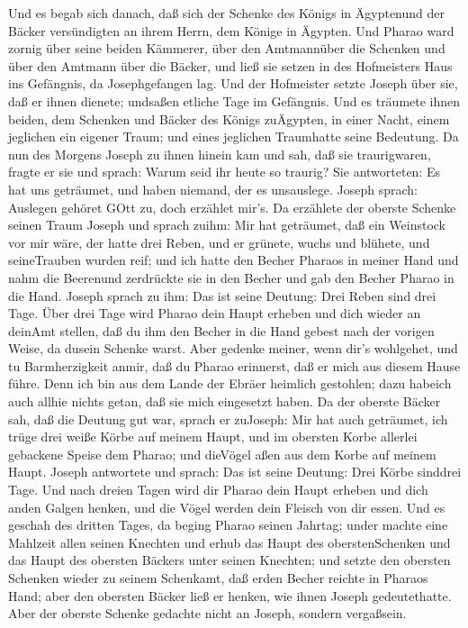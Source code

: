  Und es begab sich danach, daß sich der Schenke des Königs
in Ägyptenund der Bäcker versündigten an ihrem Herrn, dem Könige in
Ägypten.  Und Pharao ward zornig über seine beiden Kämmerer,
über den Amtmannüber die Schenken und über den Amtmann über die Bäcker,
 und ließ sie setzen in des Hofmeisters Haus ins Gefängnis,
da Josephgefangen lag.  Und der Hofmeister setzte Joseph
über sie, daß er ihnen dienete; undsaßen etliche Tage im Gefängnis.
 Und es träumete ihnen beiden, dem Schenken und Bäcker des
Königs zuÄgypten, in einer Nacht, einem jeglichen ein eigener Traum; und
eines jeglichen Traumhatte seine Bedeutung.  Da nun des
Morgens Joseph zu ihnen hinein kam und sah, daß sie traurigwaren,
 fragte er sie und sprach: Warum seid ihr heute so traurig?
 Sie antworteten: Es hat uns geträumet, und haben niemand,
der es unsauslege. Joseph sprach: Auslegen gehöret GOtt zu, doch
erzählet mir's.  Da erzählete der oberste Schenke seinen
Traum Joseph und sprach zuihm: Mir hat geträumet, daß ein Weinstock vor
mir wäre,  der hatte drei Reben, und er grünete, wuchs und
blühete, und seineTrauben wurden reif;  und ich hatte den
Becher Pharaos in meiner Hand und nahm die Beerenund zerdrückte sie in
den Becher und gab den Becher Pharao in die Hand.  Joseph
sprach zu ihm: Das ist seine Deutung: Drei Reben sind drei Tage.
 Über drei Tage wird Pharao dein Haupt erheben und dich
wieder an deinAmt stellen, daß du ihm den Becher in die Hand gebest nach
der vorigen Weise, da dusein Schenke warst.  Aber gedenke
meiner, wenn dir's wohlgehet, und tu Barmherzigkeit anmir, daß du Pharao
erinnerst, daß er mich aus diesem Hause führe.  Denn ich
bin aus dem Lande der Ebräer heimlich gestohlen; dazu habeich auch
allhie nichts getan, daß sie mich eingesetzt haben.  Da der
oberste Bäcker sah, daß die Deutung gut war, sprach er zuJoseph: Mir hat
auch geträumet, ich trüge drei weiße Körbe auf meinem Haupt,
 und im obersten Korbe allerlei gebackene Speise dem
Pharao; und dieVögel aßen aus dem Korbe auf meinem Haupt. 
Joseph antwortete und sprach: Das ist seine Deutung: Drei Körbe sinddrei
Tage.  Und nach dreien Tagen wird dir Pharao dein Haupt
erheben und dich anden Galgen henken, und die Vögel werden dein Fleisch
von dir essen.  Und es geschah des dritten Tages, da beging
Pharao seinen Jahrtag; under machte eine Mahlzeit allen seinen Knechten
und erhub das Haupt des oberstenSchenken und das Haupt des obersten
Bäckers unter seinen Knechten;  und setzte den obersten
Schenken wieder zu seinem Schenkamt, daß erden Becher reichte in Pharaos
Hand;  aber den obersten Bäcker ließ er henken, wie ihnen
Joseph gedeutethatte.  Aber der oberste Schenke gedachte
nicht an Joseph, sondern vergaßsein.

